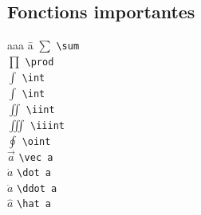 \documentclass{article}
\newenvironment{tighttabbing}
  {\begingroup\setlength{\parskip}{0pt}\begin{tabbing}}
  {\end{tabbing}\endgroup}
\let\code\lstinline
\begin{document}
\begin{multicols*}{3}
\begin{multicols*}{3}
\end{multicols*}
\subsection*{Fonctions importantes}
\begin{multicols*}{4}
\begin{tighttabbing}
    aaa \= a \kill
    $\sum$    \> \code?\sum?    \\
    $\prod$  \> \code?\prod?  \\
    $\int$   \> \code?\int?   \\
    $\int$    \> \code?\int?    \\
    $\iint$  \> \code?\iint?  \\
    $\iiint$ \> \code?\iiint? \\
    $\oint$ \> \code?\oint? \\
    $\vec a$ \> \code?\vec a? \\
    $\dot a$ \> \code?\dot a? \\
    $\ddot a$ \> \code?\ddot a? \\
    $\hat a$ \> \code?\hat a?  \\
\end{tighttabbing}
\end{multicols*}


\end{multicols*}
\end{document}
